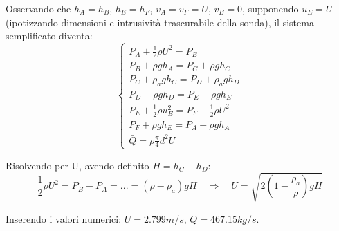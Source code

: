 Osservando che $h_A = h_B$, $h_E = h_F$, $v_A = v_F = U$, 
$v_B = 0$, supponendo $u_E = U$ (ipotizzando dimensioni e intrusività trascurabile della sonda), il sistema semplificato diventa:
\begin{equation}
\begin{cases}
  P_A + \frac{1}{2} \rho U^2  = P_B \\
  P_B + \rho g h_A = P_C + \rho g h_C   \\
  P_C + \rho_a g h_C = P_D + \rho_a g h_D\\
  P_D + \rho g h_D = P_E + \rho g h_E \\
  P_E + \frac{1}{2} \rho u_E^2 = P_F + \frac{1}{2} \rho U^2 \\
 P_F + \rho g h_E = P_A + \rho g h_A \\
  \bar{Q} = \rho \frac{\pi}{4}d^2 U
\end{cases}
\end{equation}

Risolvendo per U, avendo definito $H = h_C - h_D$:
\begin{equation}
  \frac{1}{2} \rho U^2 = P_B - P_A = ... = (\rho - \rho_a) g H \quad \Rightarrow \quad 
  U = \sqrt{2\displaystyle\left(1-\frac{\rho_a}{\rho}\right) g H}
\end{equation}

Inserendo i valori numerici: $U = 2.799 m/s$, $\bar{Q} = 467.15 kg/s$.


